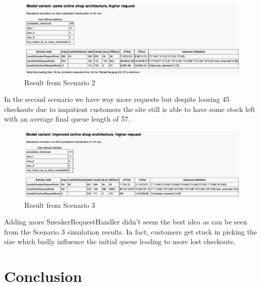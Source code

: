 \documentclass{article}
\begin{document}
\begin{figure}[h]
    \centering
    \includegraphics[width=1.0\textwidth]{Scenario2_Results}
    \caption{Result from Scenario 2}
 \end{figure}
 \FloatBarrier
In the second scenario we have way more requests but despite loosing 45 checkouts due to impatient customers the site still is able to have some stock left with an average final queue length of 57.
 
\begin{figure}[h]
   \centering
   \includegraphics[width=1.0\textwidth]{Scenario3_Results}
   \caption{Result from Scenario 3}
\end{figure}
 \FloatBarrier
Adding more SneakerRequestHandler didn't seem the best idea as can be seen from the Scenario 3 simulation results. In fact, customers get stuck in picking the size which badly influence the initial queue leading to more lost checkouts.
 
 

\section{Conclusion}
\end{document}
